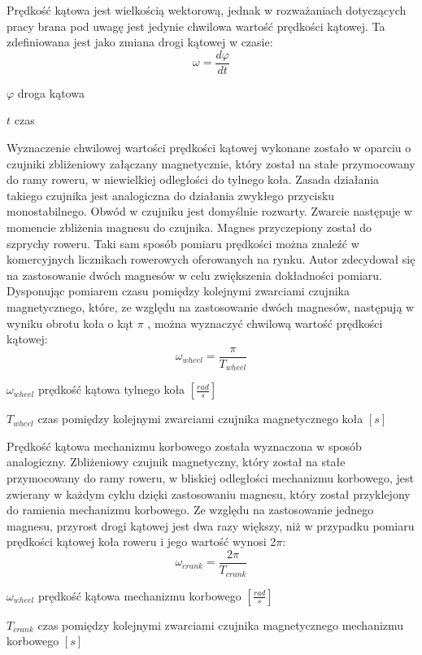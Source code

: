 Prędkość kątowa jest wielkością wektorową, jednak w rozważaniach dotyczących pracy brana pod uwagę jest jedynie chwilowa wartość prędkości kątowej. Ta zdefiniowana jest jako zmiana drogi kątowej w czasie:
\begin{equation}
    \omega = \frac{d\varphi}{dt}
    \label{eq:predkoscKatowa}
\end{equation}
\begin{eqwhere}[2cm]
	\item[$\varphi$] droga kątowa
	\item[$t$] czas
\end{eqwhere}
Wyznaczenie chwilowej wartości prędkości kątowej wykonane zostało w oparciu o czujniki zbliżeniowy załączany magnetycznie, który został na stałe przymocowany do ramy roweru, w niewielkiej odległości do tylnego koła. Zasada działania takiego czujnika jest analogiczna do działania zwykłego przycisku monostabilnego. Obwód w czujniku jest domyślnie rozwarty. Zwarcie następuje w momencie zbliżenia magnesu do czujnika. Magnes przyczepiony został do szprychy roweru. Taki sam sposób pomiaru prędkości można znaleźć w komercyjnych licznikach rowerowych oferowanych na rynku. Autor zdecydował się na zastosowanie dwóch magnesów w celu zwiększenia dokładności pomiaru. Dysponując pomiarem czasu pomiędzy kolejnymi zwarciami czujnika magnetycznego, które, ze względu na zastosowanie dwóch magnesów, następują w wyniku obrotu koła o kąt $\pi$ , można wyznaczyć chwilową wartość prędkości kątowej: 
\begin{equation}
    \omega_{wheel} = \frac{\pi}{T_{wheel}}
\end{equation}
\begin{eqwhere}[2cm]
    \item[$\omega_{wheel}$] prędkość kątowa tylnego koła $[\frac{rad}{s}]$
	\item[$T_{wheel}$] czas pomiędzy kolejnymi zwarciami czujnika magnetycznego koła $[s]$
\end{eqwhere}
Prędkość kątowa mechanizmu korbowego została wyznaczona w sposób analogiczny. Zbliżeniowy czujnik magnetyczny, który został na stałe przymocowany do ramy roweru, w bliskiej odległości mechanizmu korbowego, jest zwierany w każdym cyklu dzięki zastosowaniu magnesu, który został przyklejony do ramienia mechanizmu korbowego. Ze względu na zastosowanie jednego magnesu, przyrost drogi kątowej jest dwa razy większy, niż w przypadku pomiaru prędkości kątowej koła roweru i jego wartość wynosi 2$\pi$:
\begin{equation}
    \omega_{crank} = \frac{2\pi}{T_{crank}}
\end{equation}
\begin{eqwhere}[2cm]
    \item[$\omega_{wheel}$] prędkość kątowa mechanizmu korbowego $[\frac{rad}{s}]$
	\item[$T_{crank}$] czas pomiędzy kolejnymi zwarciami czujnika magnetycznego mechanizmu korbowego $[s]$
\end{eqwhere}
